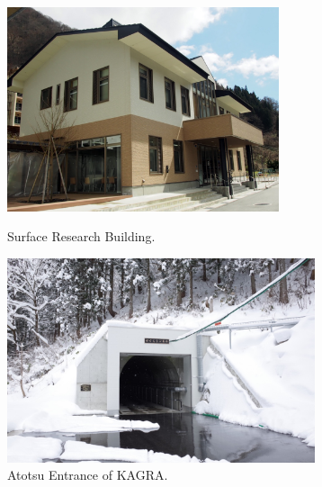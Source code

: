 \medskip
\medskip
\medskip

\begin{figure}[htbp]
\begin{minipage}{0.5\textwidth}
\begin{center}
\includegraphics[height=6cm, bb=0 0 1024 768]{./obs/kagra/building.jpg}
\caption{Surface Research Building.}
\end{center}
\end{minipage}
%
\begin{minipage}{0.5\textwidth}
\begin{center}
\includegraphics[height=6cm, bb=0 0 1089 722]{./obs/kagra/entrance.jpg}
\caption {Atotsu Entrance of KAGRA.}
\end{center}
\end{minipage}
\end{figure}


